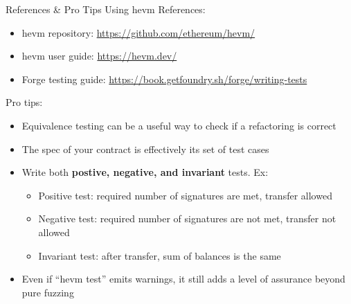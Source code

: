 \documentclass[aspectratio=169]{beamer}
\begin{document}
\begin{frame}[fragile=singleslide]{References \& Pro Tips Using hevm}
References:
\begin{itemize}
    \item hevm repository: \url{https://github.com/ethereum/hevm/}
    \item hevm user guide: \url{https://hevm.dev/}
    \item Forge testing guide: \url{https://book.getfoundry.sh/forge/writing-tests}
\end{itemize}

\bigskip

Pro tips:
\begin{itemize}
    \item Equivalence testing can be a useful way to check if a refactoring is correct
    \item The spec of your contract is effectively its set of test cases
    \item Write both \textbf{postive, negative, and invariant} tests. Ex:
        \begin{itemize}
            \item Positive test: required number of signatures are met, transfer allowed
            \item Negative test: required number of signatures are not met, transfer not allowed
            \item Invariant test: after transfer, sum of balances is the same
        \end{itemize}
    \item Even if ``hevm test'' emits warnings, it still adds a level of assurance beyond pure fuzzing
\end{itemize}


\end{frame}



%
\end{document}
